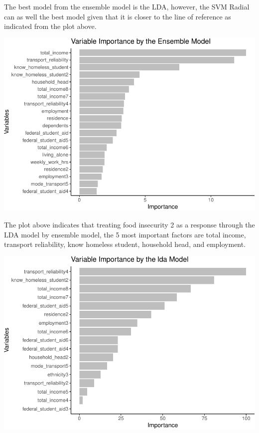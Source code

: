 \documentclass[
  10pt,
]{article}
\begin{document}
The best model from the ensemble model is the LDA, however, the SVM Radial can as well the best model given that it is closer to the line of reference as indicated from the plot above.\\

\begin{center}\includegraphics{final_phase2_report_files/figure-latex/unnamed-chunk-23-1} \end{center}

The plot above indicates that treating food insecurity 2 as a response through the LDA model by ensemble model, the 5 most important factors are total income, transport reliability, know homeless student, household head, and employment.\\

\begin{center}\includegraphics{final_phase2_report_files/figure-latex/unnamed-chunk-24-1} \end{center}
\end{document}
